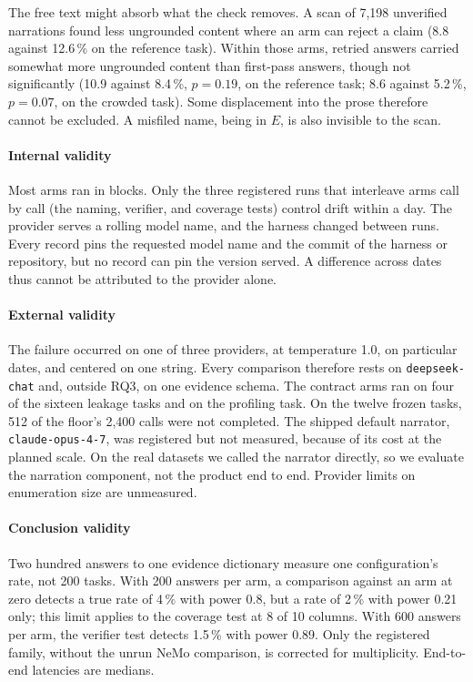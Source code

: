 \documentclass[journal]{IEEEtran}
\begin{document}
The free text might absorb what the check removes. A scan of 7{,}198 unverified
narrations found less ungrounded content where an arm can reject a claim (8.8
against 12.6\,\% on the reference task). Within those arms, retried answers
carried somewhat more ungrounded content than first-pass answers, though not
significantly (10.9 against 8.4\,\%, $p=0.19$, on the reference task; 8.6
against 5.2\,\%, $p=0.07$, on the crowded task). Some displacement into the prose
therefore cannot be excluded. A misfiled name, being in $E$, is also invisible
to the scan.

\paragraph{Internal validity}
Most arms ran in blocks. Only the three registered runs that interleave arms call
by call (the naming, verifier, and coverage tests) control drift within a day.
The provider serves a rolling model name, and the harness changed between runs.
Every record pins the requested model name and the commit of the harness or
repository, but no record can pin the version served. A difference across dates
thus cannot be attributed to the provider alone.

\paragraph{External validity}
The failure occurred on one of three providers, at temperature 1.0, on
particular dates, and centered on one string. Every comparison therefore rests on
\texttt{deepseek-chat} and, outside RQ3, on one evidence schema. The contract
arms ran on four of the sixteen leakage tasks and on the profiling task. On the
twelve frozen tasks, 512 of the floor's 2{,}400 calls were not completed. The
shipped default narrator, \texttt{claude-opus-4-7}, was registered but not
measured, because of its cost at the planned scale. On the real datasets we
called the narrator directly, so we evaluate the narration component, not the
product end to end. Provider limits on enumeration size are unmeasured.

\paragraph{Conclusion validity}
Two hundred answers to one evidence dictionary measure one configuration's rate,
not 200 tasks. With 200 answers per arm, a comparison against an arm at zero
detects a true rate of 4\,\% with power 0.8, but a rate of 2\,\% with power 0.21
only; this limit applies to the coverage test at 8 of 10 columns. With 600
answers per arm, the verifier test detects 1.5\,\% with power 0.89. Only the
registered family, without the unrun NeMo comparison, is corrected for
multiplicity. End-to-end latencies are medians.
\end{document}
